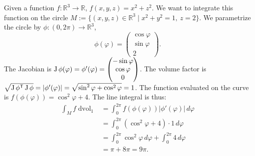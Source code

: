 \begin{example}
\label{ex:line_integral_function_circle}
Given a function $f: \mathbb{R}^3 \to \mathbb{R}$, $f(x,y,z) = x^2+z^2$. We want to integrate this function on the circle $M := \{(x,y,z) \in \mathbb{R}^3 \mid x^2+y^2=1,\ z=2\}$.
We parametrize the circle by $\phi: (0,2\pi) \to \mathbb{R}^3$,
\[\phi(\varphi) = \begin{pmatrix} \cos\varphi \\ \sin\varphi \\ 2 \end{pmatrix}.\]
The Jacobian is $\operatorname{J}\phi(\varphi) = \phi'(\varphi) = \begin{pmatrix} -\sin\varphi \\ \cos\varphi \\ 0 \end{pmatrix}$.
The volume factor is $\sqrt{\operatorname{J}\phi^{\mathsf{T}} \operatorname{J}\phi} = |\phi'(\varphi)| = \sqrt{\sin^2\varphi + \cos^2\varphi} = 1$.
The function evaluated on the curve is $f(\phi(\varphi)) = \cos^2\varphi + 4$.
The line integral is thus:
\begin{align*}
\int_M f \mathop{d\text{vol}}_1 &= \int_0^{2\pi} f(\phi(\varphi)) |\phi'(\varphi)| \,d\varphi \\
&= \int_0^{2\pi} (\cos^2\varphi + 4) \cdot 1 \,d\varphi \\
&= \int_0^{2\pi} \cos^2\varphi \,d\varphi + \int_0^{2\pi} 4 \,d\varphi \\
&= \pi + 8\pi = 9\pi.
\end{align*}
\end{example}




